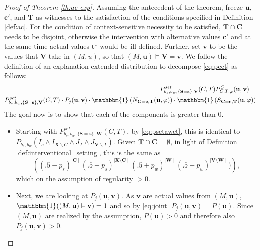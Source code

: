 \documentclass[twoside,11pt]{article}
\begin{document}
\begin{proof}[Proof of Theorem \ref{th:ac-exp}]  Assuming the antecedent of the theorem, freeze $\mathbf{u}$, $\mathbf{c'}$, and $\mathbf{T}$ as witnesses to the satisfaction of the conditions specified in Definition \ref{def:ac}. For the condition of context-sensitive necessity to be satisfied, $\mathbf{T} \cap \mathbf{C}$ needs to be disjoint, otherwise the intervention with alternative values $\mathbf{c'}$ and at the same time actual values $\mathbf{t^\star}$ would be ill-defined. Further, set $\mathbf{v}$ to be the values that $\mathbf{V}$ take in  $(M,u)$, so that $(M, \mathbf{u}) \models \mathbf{V} = \mathbf{v}$.  
We follow the definition of an explanation-extended distribution to decompose \eqref{eq:pect} as follows:
\begin{align}
    P^{\mathit{set}}_{b_s,b_w, \{\mathbf{S}=\mathbf{s}\}, \mathbf{V}}(C,T)  P^C_{C, T, \varphi} (\mathbf{u}, \mathbf{v}) = \\
      P^{\mathit{set}}_{b_s,b_w, \{\mathbf{S}=\mathbf{s}\}, \mathbf{V}}(C,T) \cdot P_j(\mathbf{u}, \mathbf{v}) \cdot \mathbbm{1}\left(N_{\mathbf{C} = \mathbf{c}, \mathbf{T}}(\mathbf{u}, \varphi)\right) \cdot \mathbbm{1}\left(S_{\mathbf{C} = \mathbf{c}, \mathbf{T}}(\mathbf{u}, \varphi)\right) \label{eq:decomposition}
\end{align}
\noindent The goal now is to show that each of the components is greater than 0.

\begin{itemize}
\item Starting with $P^{\mathit{set}}_{b_s,b_w, \{\mathbf{S}=\mathbf{s}\}, \mathbf{W}}(C,T)$, by \eqref{eq:psetawct}, this is identical to \linebreak  $P_{b_s, b_w}\left(I_c \wedge I^-_{\mathbf{X} \backslash C}  \wedge  J_T  \wedge J^-_{\mathbf{V} \backslash T} \right)$. Given  $\mathbf{T} \cap \mathbf{C} = \emptyset$, in light of Definition \ref{def:interventional_setting}, this is the same as 
\[\left( (.5-p_s)^{\mid \mathbf{C}\mid}   (.5+p_s)^{\mid \mathbf{X}\setminus \mathbf{C}\mid} (.5+p_w)^{\mid \mathbf{W}\mid} (.5-p_w)^{\mid \mathbf{V}\setminus \mathbf{W}\mid} )  \right),\] which on the assumption of regularity $>0$.

\item Next, we are looking at $P_j(\mathbf{u}, \mathbf{v})$. As $\mathbf{v}$ are actual values from $(M,\mathbf{u})$,  $\mathbbm{1}((M, \mathbf{u}) \vDash \mathbf{v})=1$ and so by \eqref{eq:joint}  $P_j(\mathbf{u}, \mathbf{v}) = P(\mathbf{u})$. Since $(M, \mathbf{u})$ are realized by the assumption, $P(\mathbf{u}) > 0$ and therefore also $P_j(\mathbf{u}, \mathbf{v})>0$. 


\end{itemize}
\end{proof}
\end{document}
